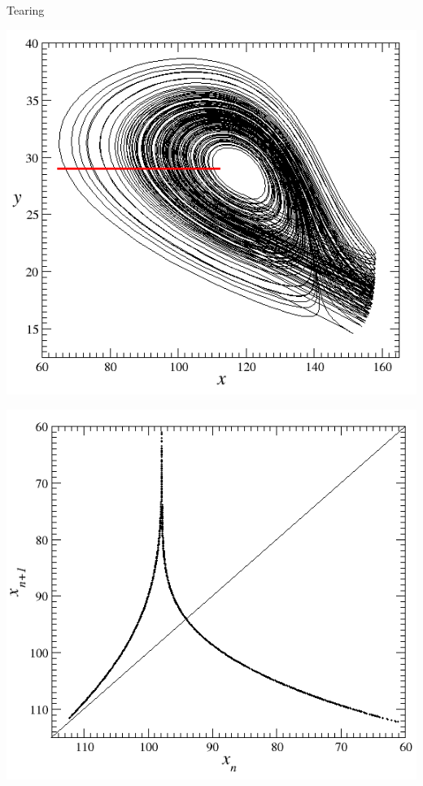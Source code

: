 \documentclass[usenames, dvipsnames, aspectratio=169]{beamer}
\begin{document}
\begin{frame}[t, c]{Tearing}{}
    \vfill
  
  \begin{minipage}{.48\textwidth}
    \centering
    \includegraphics[width=\textwidth]{tearing}
  \end{minipage}%
  \hfill
  \begin{minipage}{.48\textwidth}
    \centering
    \includegraphics[width=\textwidth]{tearing_map}
  \end{minipage}

  \vfill

\end{frame}
\end{document}
